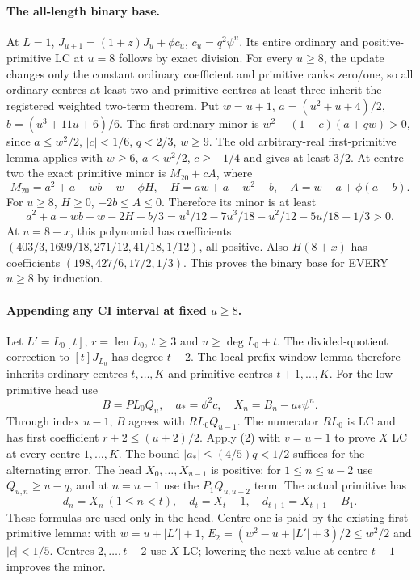 \paragraph{The all-length binary base.}
At $L=1$, $J_{u+1}=(1+z)J_u+\phi c_u$, $c_u=q^2\psi^u$.
Its entire ordinary and positive-primitive LC at $u=8$ follows
by exact division. For every $u\ge8$, the update changes only the
constant ordinary coefficient and primitive ranks zero/one, so all
ordinary centres at least two and primitive centres at least three
inherit the registered weighted two-term theorem.
Put $w=u+1$, $a=(u^2+u+4)/2$, $b=(u^3+11u+6)/6$.
The first ordinary minor is $w^2-(1-c)(a+qw)>0$, since
$a\le w^2/2$, $|c|<1/6$, $q<2/3$, $w\ge9$.
The old arbitrary-real first-primitive lemma applies with $w\ge6$,
$a\le w^2/2$, $c\ge-1/4$ and gives at least $3/2$.
At centre two the exact primitive minor is $M_{20}+cA$, where
\[
 M_{20}=a^2+a-wb-w-\phi H,\quad
 H=aw+a-w^2-b,\quad A=w-a+\phi(a-b).
\]
For $u\ge8$, $H\ge0$, $-2b\le A\le0$. Therefore its minor is at least
\[
 a^2+a-wb-w-2H-b/3
 =u^4/12-7u^3/18-u^2/12-5u/18-1/3>0.
\]
At $u=8+x$, this polynomial has coefficients
$(403/3,1699/18,271/12,41/18,1/12)$, all positive.
Also $H(8+x)$ has coefficients $(198,427/6,17/2,1/3)$.
This proves the binary base for EVERY $u\ge8$ by induction.

\paragraph{Appending any CI interval at fixed $u\ge8$.}
Let $L'=L_0[t]$, $r=\operatorname{len}L_0$, $t\ge3$ and
$u\ge\deg L_0+t$. The divided-quotient correction to $[t]J_{L_0}$
has degree $t-2$. The local prefix-window lemma therefore inherits
ordinary centres $t,\ldots,K$ and primitive centres $t+1,\ldots,K$.
For the low primitive head use
\[
 B=P L_0Q_u,\quad a_* =\phi^2c,\quad X_n=B_n-a_*\psi^n.
\]
Through index $u-1$, $B$ agrees with $RL_0Q_{u-1}$. The numerator
$RL_0$ is LC and has first coefficient $r+2\le(u+2)/2$.
Apply (2) with $v=u-1$ to prove $X$ LC at every centre $1,\ldots,K$.
The bound $|a_*|\le(4/5)q<1/2$ suffices for the alternating error.
The head $X_0,\ldots,X_{u-1}$ is positive: for $1\le n\le u-2$
use $Q_{u,n}\ge u-q$, and at $n=u-1$ use the $P_1Q_{u,u-2}$
term. The actual primitive has
\[
 d_n=X_n\ (1\le n<t),\quad d_t=X_t-1,\quad
                            d_{t+1}=X_{t+1}-B_1.       \tag{3}
\]
These formulas are used only in the head. Centre one is paid by
the existing first-primitive lemma: with $w=u+|L'|+1$,
$E_2=(w^2-u+|L'|+3)/2\le w^2/2$ and $|c|<1/5$.
Centres $2,\ldots,t-2$ use $X$ LC; lowering the next value at
centre $t-1$ improves the minor.

